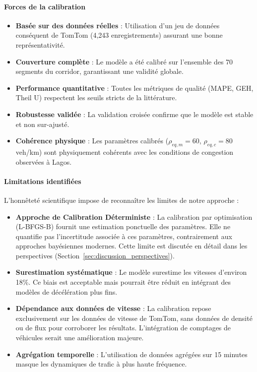 \paragraph{Forces de la calibration}
\begin{itemize}
    \item \textbf{Basée sur des données réelles} : Utilisation d'un jeu de données conséquent de TomTom (4,243 enregistrements) assurant une bonne représentativité.
    \item \textbf{Couverture complète} : Le modèle a été calibré sur l'ensemble des 70 segments du corridor, garantissant une validité globale.
    \item \textbf{Performance quantitative} : Toutes les métriques de qualité (MAPE, GEH, Theil U) respectent les seuils stricts de la littérature.
    \item \textbf{Robustesse validée} : La validation croisée confirme que le modèle est stable et non sur-ajusté.
    \item \textbf{Cohérence physique} : Les paramètres calibrés ($\rho_{eq,m}=60$, $\rho_{eq,c}=80$ veh/km) sont physiquement cohérents avec les conditions de congestion observées à Lagos.
\end{itemize}

\paragraph{Limitations identifiées}
\label{subsec:limitations_calibration}
L'honnêteté scientifique impose de reconnaître les limites de notre approche :
\begin{itemize}
    \item \textbf{Approche de Calibration Déterministe} : La calibration par optimisation (L-BFGS-B) fournit une estimation ponctuelle des paramètres. Elle ne quantifie pas l'incertitude associée à ces paramètres, contrairement aux approches bayésiennes modernes. Cette limite est discutée en détail dans les perspectives (Section~\ref{sec:discussion_perspectives}).
    \item \textbf{Surestimation systématique} : Le modèle surestime les vitesses d'environ 18\%. Ce biais est acceptable mais pourrait être réduit en intégrant des modèles de décélération plus fins.
    \item \textbf{Dépendance aux données de vitesse} : La calibration repose exclusivement sur les données de vitesse de TomTom, sans données de densité ou de flux pour corroborer les résultats. L'intégration de comptages de véhicules serait une amélioration majeure.
    \item \textbf{Agrégation temporelle} : L'utilisation de données agrégées sur 15 minutes masque les dynamiques de trafic à plus haute fréquence.
\end{itemize}

